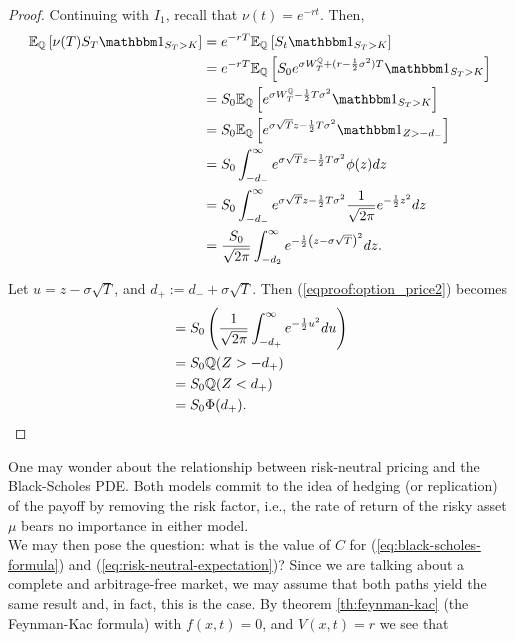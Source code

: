 \documentclass[../TGMAFFIRO.tex]{subfiles}
\begin{document}
\begin{proof}
	Continuing with $I_1$, recall that $\nu(t) = e^{-rt}$. Then,
	\begin{align}
		\ExpMeasure{\Qm}{\nu(T)S_T\ind_{S_T > K}} &= e^{-rT}\ExpMeasure{\Qm}{S_t\ind_{S_T > K}} \nonumber \\
		&= e^{-rT}\ExpMeasure{\Qm}{S_0e^{\sigma\QBm{T} + (r - \frac{1}{2}\sigma^2)T}\ind_{S_T > K}} \nonumber \\
		&= S_0 \ExpMeasure{\Qm}{e^{\sigma\QBm{T} - \frac{1}{2}T\sigma^2}\ind_{S_T > K}} \nonumber \\
		&= S_0 \ExpMeasure{\Qm}{e^{\sigma\sqrt{T}z - \frac{1}{2}T\sigma^2}\ind_{Z > -d_-}} \nonumber \\
		&= S_0\int_{-d_-}^\infty e^{\sigma\sqrt{T}z - \frac{1}{2}T\sigma^2} \phi(z) dz \nonumber \\
		&= S_0\int_{-d_-}^\infty e^{\sigma\sqrt{T}z - \frac{1}{2}T\sigma^2} \frac{1}{\sqrt{2\pi}} e^{-\frac{1}{2}z^2} dz \nonumber \\
		&= \frac{S_0}{\sqrt{2\pi}}\int_{-d_2}^{\infty}e^{-\frac{1}{2}\left(z - \sigma\sqrt{T}\right)^2} dz.\label{eqproof:option_price2}
	\end{align}
	
	Let $u = z - \sigma\sqrt{T}$, and $d_+ := d_- + \sigma\sqrt{T}$. Then (\ref{eqproof:option_price2}) becomes
	\begin{align}
		&=S_0\left(\frac{1}{\sqrt{2\pi}}\int_{-d_+}^{\infty} e^{-\frac{1}{2}u^2} du\right) \nonumber \\
		&= S_0\mathbb{Q}(Z > -d_+) \nonumber\\
		&= S_0\mathbb{Q}(Z < d_+) \nonumber \\
		&= S_0 \Phi(d_+).
	\end{align}
\end{proof}

One may wonder about the relationship between risk-neutral pricing and the Black-Scholes PDE. Both models commit to the idea of hedging (or replication) of the payoff by removing the risk factor, i.e., the rate of return of the risky asset $\mu$ bears no importance in either model.\\

We may then pose the question: what is the value of $C$ for (\ref{eq:black-scholes-formula}) and (\ref{eq:risk-neutral-expectation})? Since we are talking about a complete and arbitrage-free market, we may assume that both paths yield the same result and, in fact, this is the case. By theorem \ref{th:feynman-kac} (the Feynman-Kac formula) with $f(x,t) = 0$, and $V(x,t) = r$ we see that
\end{document}
